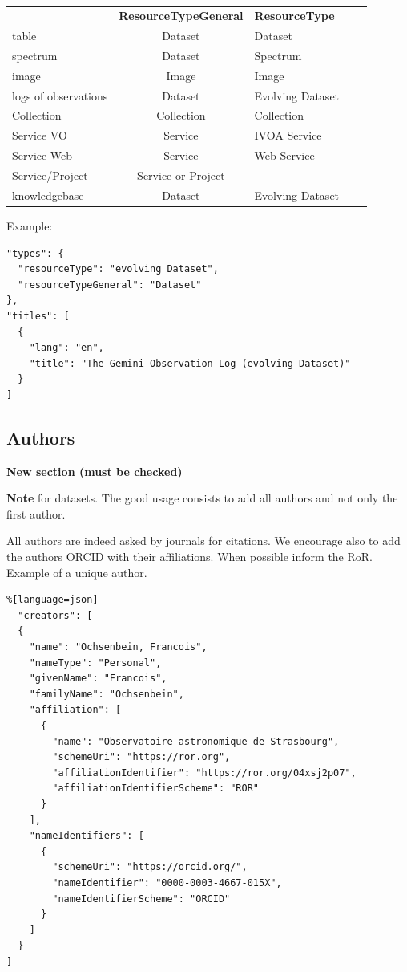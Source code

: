 \documentclass[11pt,a4paper]{ivoa}
\newcommand{\important}[1]{
	\begin{bigdescription}
		\item \color{ivoacolor}\textbf{Note} #1
	\end{bigdescription}
}
\begin{document}
\begin{table}[th]
\begin{tabular}{lclcr}
	\sptablerule
	 & \textbf{ResourceTypeGeneral} & \textbf{ResourceType}  \\
	\sptablerule
table         & Dataset             & Dataset          \\
spectrum      & Dataset             & Spectrum         \\
image         & Image               & Image            \\
logs of observations & Dataset      & Evolving Dataset \\
Collection    & Collection          & Collection       \\
Service VO    & Service             & IVOA Service     \\
Service Web   & Service             & Web Service      \\
Service/Project & Service or Project & \\
knowledgebase & Dataset             & Evolving Dataset \\  
\end{tabular}%
\caption{\label{tab:resourcetype}}
\end{table}

Example:

\begin{lstlisting}
"types": {
  "resourceType": "evolving Dataset",
  "resourceTypeGeneral": "Dataset"
},
"titles": [
  {
	"lang": "en",
	"title": "The Gemini Observation Log (evolving Dataset)"
  }
]
\end{lstlisting}

\subsection{Authors}\label{sec:authors}
\textbf{\color{red}New section (must be checked)}

\important{for datasets. The good usage consists to add all authors and not only the first author. }


All authors are indeed asked by journals for citations.
We encourage also to add the authors ORCID with their affiliations. When possible inform the RoR.\\

Example of a unique author.

\begin{lstlisting}%[language=json]
  "creators": [
  {
    "name": "Ochsenbein, Francois",
    "nameType": "Personal",
    "givenName": "Francois",
    "familyName": "Ochsenbein",
    "affiliation": [
      {
        "name": "Observatoire astronomique de Strasbourg",
        "schemeUri": "https://ror.org",
        "affiliationIdentifier": "https://ror.org/04xsj2p07",
        "affiliationIdentifierScheme": "ROR"
      }
    ],
    "nameIdentifiers": [
      {
        "schemeUri": "https://orcid.org/",
        "nameIdentifier": "0000-0003-4667-015X",
        "nameIdentifierScheme": "ORCID"
      }
    ]
  }
]
\end{lstlisting}
\end{document}
